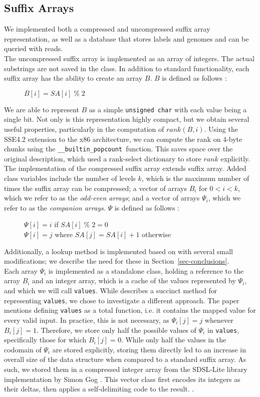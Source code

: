 \documentclass{article}
\newcommand{\popcnt}{\texttt{\_\_builtin\_popcount }}
\begin{document}
\subsection{Suffix Arrays}
\label{subsec-sa}
We implemented both a compressed and uncompressed suffix array representation, as well as a database that stores labels and genomes and can be queried with reads.\\
\indent The uncompressed suffix array is implemented as an array of integers. The actual substrings are not saved in the class. In addition to standard functionality, each suffix array has the ability to create an array $B$. $B$ is defined as follows \cite{GV05}:
\begin{figure}[H]
$B[i] = SA[i]\;\%\;2$
\end{figure}
\indent We are able to represent $B$ as a simple \texttt{unsigned char\*} with each value being a single bit. Not only is this representation highly compact, but we obtain several useful properties, particularly in the computation of $rank(B,i)$. Using the SSE4.2 extension to the x86 architecture, we can compute the rank on 4-byte chunks using the \popcnt function. This saves space over the original description, which used a rank-select dictionary to store $rank$ explicitly.\\
\indent The implementation of the compressed suffix array extends suffix array. Added class variables include the number of levels $k$, which is the maximum number of times the suffix array can be compressed; a vector of arrays $B_i$ for $0 < i < k$, which we refer to as the \emph{odd-even arrays}; and a vector of arrays $\Psi_i$, which we refer to as the \emph{companion arrays}. $\Psi$ is defined as follows \cite{GV05}:
\begin{figure}[H]
\label{fig-defn-psi}
$\Psi[i] = i$ if $SA[i]\;\%\; 2 = 0$\\
$\Psi[i] = j$ where $SA[j] = SA[i]+1$ otherwise
\end{figure}
Additionally, a lookup method is implemented based on \cite{GV05} with several small modifications; we describe the need for these in Section~\ref{sec-conclusions}.\\
\indent Each array $\Psi_i$ is implemented as a standalone class, holding a reference to the array $B_i$ and an integer array, which is a cache of the values represented by $\Psi_i$, and which we will call \texttt{values}. While \cite{GV05} describes a succinct method for representing \texttt{values}, we chose to investigate a different approach. The paper mentions defining \texttt{values} as a total function, i.e. it contains the mapped value for every valid input. In practice, this is not necessary, as $\Psi_i[j] = j$ whenever $B_i[j] = 1$. Therefore, we store only half the possible values of $\Psi_i$ in \texttt{values}, specifically those for which $B_i[j] = 0$. While only half the values in the codomain of $\Psi_i$ are stored explicitly, storing them directly led to an increase in overall size of the data structure when compared to a standard suffix array. As such, we stored them in a compressed integer array from the SDSL-Lite library implementation by Simon Gog \cite{SDSL}. This vector class first encodes its integers as their deltas, then applies a self-delimiting code to the result. \cite{OS07}.\\
\end{document}
